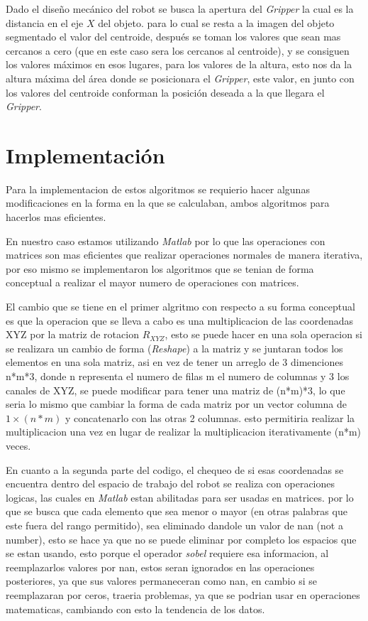     Dado el diseño mecánico del robot se busca la apertura del \textit{Gripper} la cual es la distancia en el eje $X$ del objeto. para lo cual se resta a la imagen del objeto segmentado el valor del centroide, después se toman los valores que sean mas cercanos a cero (que en este caso sera los cercanos al centroide), y  se consiguen los valores máximos en esos lugares, para los valores de la altura,  esto nos da la altura máxima del área donde se posicionara el \textit{Gripper}, este valor, en junto con los valores del centroide conforman la posición deseada a la que llegara el \textit{Gripper}.
    
    \section{Implementación}
    
    Para la implementacion de estos algoritmos se requierio hacer algunas modificaciones en la forma en la que se calculaban, ambos algoritmos para hacerlos mas eficientes.
    
    En nuestro caso estamos utilizando \textit{Matlab} por lo que las operaciones con matrices son mas eficientes que realizar operaciones normales de manera iterativa, por eso mismo se implementaron los algoritmos que se tenian de forma conceptual a realizar el mayor numero de operaciones con matrices. 
    
    El cambio que se tiene en el primer algritmo con respecto a su forma conceptual es que la operacion que se lleva a cabo es una multiplicacion de las coordenadas XYZ por la matriz de rotacion $R_{XYZ}$, esto se puede hacer en una sola operacion si se realizara un cambio de forma (\textit{Reshape}) a la matriz y se juntaran todos los elementos en una sola matriz, asi en vez de tener un arreglo de 3 dimenciones n*m*3, donde n representa el numero de filas m el numero de columnas y 3 los canales de XYZ, se puede modificar para tener una matriz de (n*m)*3, lo que seria lo mismo que cambiar la forma de cada matriz por un vector columna de $1\times(n*m)$ y concatenarlo con las otras 2 columnas. esto permitiria realizar la multiplicacion una vez en lugar de realizar la multiplicacion iterativamente (n*m) veces.   
    
    En cuanto a la segunda parte del codigo, el chequeo de si esas coordenadas se encuentra dentro del espacio de trabajo del robot se realiza con operaciones logicas, las cuales en \textit{Matlab} estan abilitadas para ser usadas en matrices. por lo que se busca que cada elemento que sea menor o mayor (en otras palabras que este fuera del  rango permitido), sea eliminado dandole un valor de nan (not a number), esto se hace ya que no se puede eliminar por completo los espacios que se estan usando, esto porque el operador \textit{sobel} requiere esa informacion, al reemplazarlos valores por nan, estos seran ignorados en las operaciones posteriores, ya que sus valores permaneceran como nan, en cambio si se reemplazaran por ceros, traeria problemas, ya que se podrian usar en operaciones matematicas, cambiando con esto la tendencia de los datos.
    
